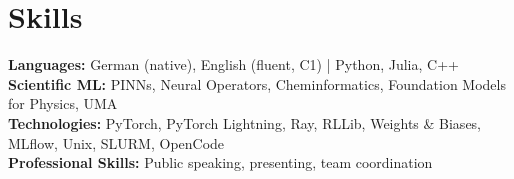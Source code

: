 \section*{Skills}
\textbf{Languages:} German (native), English (fluent, C1) | Python, Julia, C++\\
\textbf{Scientific ML:} PINNs, Neural Operators, Cheminformatics, Foundation Models for Physics, UMA\\
\textbf{Technologies:} PyTorch, PyTorch Lightning, Ray, RLLib, Weights \& Biases, MLflow, Unix, SLURM, OpenCode \\
\textbf{Professional Skills:} Public speaking, presenting, team coordination \\